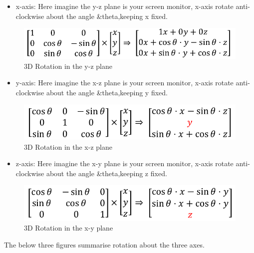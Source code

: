 \documentclass[
]{book}
\providecommand{\tightlist}{%
  \setlength{\itemsep}{0pt}\setlength{\parskip}{0pt}}
\begin{document}
\begin{itemize}
\tightlist
\item
  {x-axis}: Here imagine the y-z plane is your screen monitor, {x-axis} rotate anti-clockwise about the angle \&theta,keeping x fixed.
\end{itemize}

\begin{figure}
\centering
\includegraphics{img/08-image14.png}
\caption{\label{fig:3d-rotation1}3D Rotation in the y-z plane}
\end{figure}

\begin{itemize}
\tightlist
\item
  {y-axis}: Here imagine the x-z plane is your screen monitor, {x-axis} rotate anti-clockwise about the angle \&theta,keeping y fixed.
\end{itemize}

\begin{figure}
\centering
\includegraphics{img/08-image15.png}
\caption{\label{fig:3d-rotation2}3D Rotation in the x-z plane}
\end{figure}

\begin{itemize}
\tightlist
\item
  {z-axis}: Here imagine the x-y plane is your screen monitor, {x-axis} rotate anti-clockwise about the angle \&theta,keeping z fixed.
\end{itemize}

\begin{figure}
\centering
\includegraphics{img/08-image16.png}
\caption{\label{fig:3d-rotation3}3D Rotation in the x-y plane}
\end{figure}

The below three figures summarise rotation about the three axes.
\end{document}
